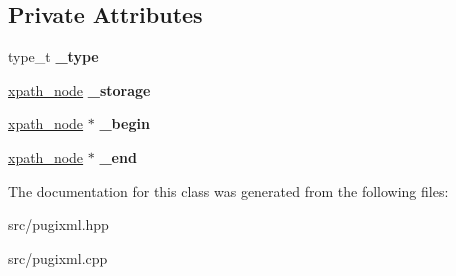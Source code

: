 \subsection*{Private Attributes}
\begin{DoxyCompactItemize}
\item 
\mbox{\label{classpugi_1_1xpath__node__set_a1697de0286a6d6de55e4c96f1a5ebc0b}} 
type\+\_\+t {\bfseries \+\_\+type}
\item 
\mbox{\label{classpugi_1_1xpath__node__set_af524f5c54de7f38ec87b944348438636}} 
\hyperlink{classpugi_1_1xpath__node}{xpath\+\_\+node} {\bfseries \+\_\+storage}
\item 
\mbox{\label{classpugi_1_1xpath__node__set_ab392b2e446d87f998998526d7ec4e2cf}} 
\hyperlink{classpugi_1_1xpath__node}{xpath\+\_\+node} $\ast$ {\bfseries \+\_\+begin}
\item 
\mbox{\label{classpugi_1_1xpath__node__set_ada2ff69224aee219433c90734c904cf9}} 
\hyperlink{classpugi_1_1xpath__node}{xpath\+\_\+node} $\ast$ {\bfseries \+\_\+end}
\end{DoxyCompactItemize}


The documentation for this class was generated from the following files\+:\begin{DoxyCompactItemize}
\item 
src/pugixml.\+hpp\item 
src/pugixml.\+cpp\end{DoxyCompactItemize}
